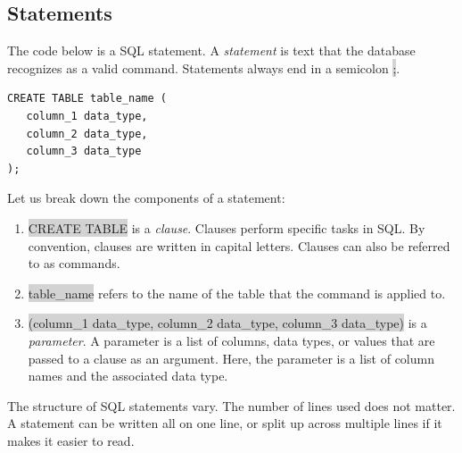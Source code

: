 \documentclass[11pt]{article}
\begin{document}
\subsection{Statements}
The code below is a SQL statement. A \textit{statement} is text that the database recognizes as a valid command. Statements always end in a semicolon \colorbox{lightgray}{;}.
\begin{lstlisting}
CREATE TABLE table_name (
   column_1 data_type, 
   column_2 data_type, 
   column_3 data_type
);
\end{lstlisting}
Let us break down the components of a statement:
\begin{enumerate}[leftmargin = *]
\item \colorbox{lightgray}{CREATE TABLE} is a \textit{clause}. Clauses perform specific tasks in SQL. By convention, clauses are written in capital letters. Clauses can also be referred to as commands.
\item \colorbox{lightgray}{table\_name} refers to the name of the table that the command is applied to.
\item \colorbox{lightgray}{(column\_1 data\_type, column\_2 data\_type, column\_3 data\_type)} is a \textit{parameter}. A parameter is a list of columns, data types, or values that are passed to a clause as an argument. Here, the parameter is a list of column names and the associated data type.
\end{enumerate}
The structure of SQL statements vary. The number of lines used does not matter. A statement can be written all on one line, or split up across multiple lines if it makes it easier to read. 
\end{document}
